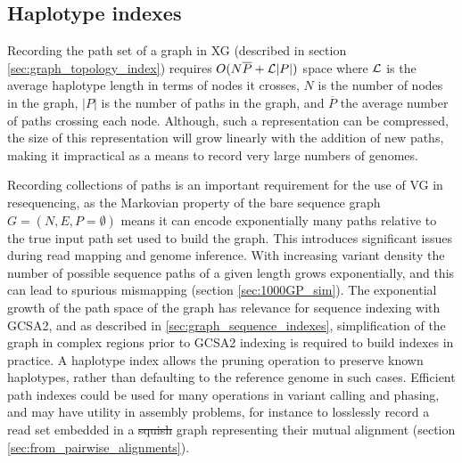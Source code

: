 \documentclass[a4paper,12pt,numbered,oneside]{Classes/PhDThesisPSnPDF}
\providecommand{\DIFaddtex}[1]{{\protect\color{blue}\uwave{#1}}} %
\providecommand{\DIFdeltex}[1]{{\protect\color{red}\sout{#1}}}                      %
\providecommand{\DIFaddbegin}{} %
\providecommand{\DIFaddend}{} %
\providecommand{\DIFdelbegin}{} %
\providecommand{\DIFdelend}{} %
\providecommand{\DIFadd}[1]{\texorpdfstring{\DIFaddtex{#1}}{#1}} %
\providecommand{\DIFdel}[1]{\texorpdfstring{\DIFdeltex{#1}}{}} %
\begin{document}
\DIFaddend 

\subsection{Haplotype indexes}
Recording the path set of a graph in XG (described in section \ref{sec:graph_topology_index}) requires $O(N\overline{P} + {\cal L}|P|)$ space where ${\cal L}$ is the average haplotype length in terms of nodes it crosses, $N$ is the number of nodes in the graph, $|P|$ is the number of paths in the graph, and $\overline{P}$ the average number of paths crossing each node.
Although, such a representation can be compressed, the size of this representation will grow linearly with the addition of new paths, making it impractical as a means to record very large numbers of genomes.

Recording collections of paths is an important requirement for the use of VG in resequencing, as the Markovian property of the bare sequence graph $G = (N, E, P= \emptyset)$ means it can encode exponentially many paths relative to the true input path set used to build the graph.
This introduces significant issues during read mapping and genome inference.
With increasing variant density the number of possible sequence paths of a given length grows exponentially, and this can lead to spurious mismapping (section \ref{sec:1000GP_sim}).
The exponential growth of the path space of the graph has relevance for sequence indexing with GCSA2, and as described in \ref{sec:graph_sequence_indexes}, simplification of the graph in complex regions prior to GCSA2 indexing is required to build indexes in practice.
A haplotype index allows the pruning operation to preserve known haplotypes, rather than defaulting to the reference genome in such cases.
Efficient path indexes could be used for many operations in variant calling and phasing, and may have utility in assembly problems, for instance to losslessly record a read set embedded in a \DIFdelbegin \DIFdel{squish }\DIFdelend \DIFaddbegin \DIFadd{variation }\DIFaddend graph representing their mutual alignment (section \ref{sec:from_pairwise_alignments}).
\end{document}
